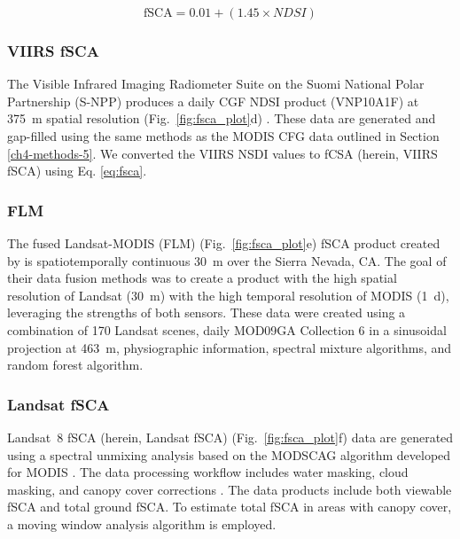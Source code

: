 \begin{equation}
\text{fSCA} = 0.01 + (1.45 \times NDSI)
\label{eq:fsca}
\end{equation}

\hypertarget{ch4-methods-6}{\subsubsection{VIIRS fSCA}\label{ch4-methods-6}}

The Visible Infrared Imaging Radiometer Suite on the Suomi National Polar Partnership (S-NPP) produces a daily CGF NDSI product (VNP10A1F) at 375~m spatial resolution (Fig.~\ref{fig:fsca_plot}d) \citep{hallEvaluationMODISVIIRS2019}. These data are generated and gap-filled using the same methods as the MODIS CFG data outlined in Section \ref{ch4-methods-5}. We converted the VIIRS NSDI values to fCSA (herein, VIIRS fSCA) using Eq. \ref{eq:fsca}.

\hypertarget{ch4-methods-7}{\subsubsection{FLM}\label{ch4-methods-7}}

The fused Landsat-MODIS (FLM) (Fig.~\ref{fig:fsca_plot}e) fSCA product created by \cite{rittgerMultisensorFusionUsing2021} is spatiotemporally continuous 30~m over the Sierra Nevada, CA. The goal of their data fusion methods was to create a product with the high spatial resolution of Landsat (30~m) with the high temporal resolution of MODIS (1~d), leveraging the strengths of both sensors. These data were created using a combination of 170 Landsat scenes, daily MOD09GA Collection 6 in a sinusoidal projection at 463~m, physiographic information, spectral mixture algorithms, and random forest algorithm. 

\hypertarget{ch4-methods-8}{\subsubsection{Landsat fSCA}\label{ch4-methods-8}}

Landsat~8 fSCA (herein, Landsat fSCA) (Fig.~\ref{fig:fsca_plot}f) \citep{selkowitzUSGSLandsatSnow2017} data are generated using a spectral unmixing analysis based on the MODSCAG algorithm developed for MODIS \citep{painterRetrievalSubpixelSnow2009}. The data processing workflow includes water masking, cloud masking, and canopy cover corrections \citep{selkowitzUSGSLandsatSnow2017, stillingerLandsatMODISVIIRS2023}. The data products include both viewable fSCA and total ground fSCA. To estimate total fSCA in areas with canopy cover, a moving window analysis algorithm is employed.


